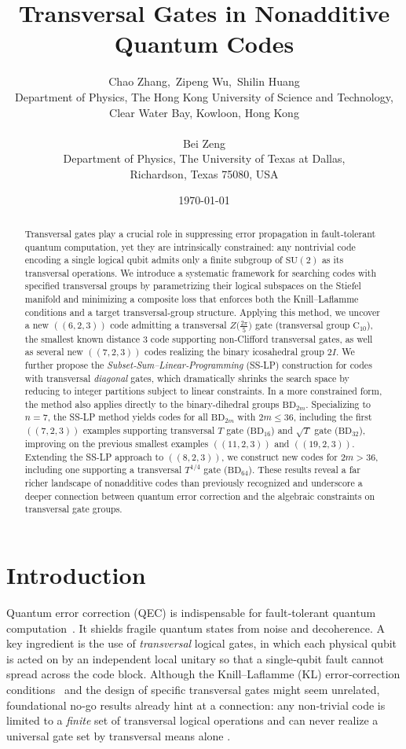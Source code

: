 \documentclass[8pt]{article}
\title{Transversal Gates in Nonadditive Quantum Codes}
\author{Chao Zhang,\   Zipeng Wu,\  Shilin Huang\\ 
Department of Physics, The Hong Kong University of Science and Technology, \\
Clear Water Bay, Kowloon, Hong Kong\\\small\\
Bei Zeng\\ Department of Physics, The University of Texas at Dallas,\\ Richardson, Texas 75080, USA}
\date{\today}
\theoremstyle{definition}
\begin{document}
\maketitle

\begin{abstract}
    Transversal gates play a crucial role in suppressing error propagation in fault‑tolerant quantum computation, yet they are intrinsically constrained: any nontrivial code encoding a single logical qubit admits only a finite subgroup of $\mathrm{SU}(2)$ as its transversal operations. We introduce a systematic framework for searching codes with specified transversal groups by parametrizing their logical subspaces on the Stiefel manifold and minimizing a composite loss that enforces both the Knill–Laflamme conditions and a target transversal‑group structure.  Applying this method, we uncover a new $((6,2,3))$ code admitting a transversal $Z\bigl(\tfrac{2\pi}{5}\bigr)$ gate (transversal group $\mathrm{C}_{10}$), the smallest known distance $3$ code supporting non‑Clifford transversal gates, as well as several new $((7,2,3))$ codes realizing the binary icosahedral group $2I$. We further propose the \emph{Subset‑Sum–Linear‑Programming} (SS‑LP) construction for codes with transversal \emph{diagonal} gates,  which dramatically shrinks the search space by reducing to integer partitions subject to linear constraints. In a more constrained form, the method also applies directly to the binary-dihedral groups $\mathrm{BD}_{2m}$.  Specializing to $n=7$, the SS‑LP method yields codes for all $\mathrm{BD}_{2m}$ with $2m\le 36$,  including the first $((7,2,3))$ examples supporting transversal $T$ gate ($\mathrm{BD}_{16}$) and $\sqrt{T}$ gate ($\mathrm{BD}_{32}$), improving on the previous smallest examples $((11,2,3))$ and $((19,2,3))$. Extending the SS-LP approach to $((8,2,3))$, we construct new codes for $2m>36$, including one supporting a transversal $T^{1/4}$ gate ($\mathrm{BD}_{64}$).  These results reveal a far richer landscape of nonadditive codes than previously recognized and underscore a deeper connection between quantum error correction and the algebraic constraints on transversal gate groups.
\end{abstract}

\section{Introduction}

Quantum error correction (QEC) is indispensable for fault‑tolerant quantum
computation~\cite{calderbank1998quantum}. It shields fragile quantum states from noise and decoherence.
A key ingredient is the use of \emph{transversal} logical gates, in which
each physical qubit is acted on by an independent local unitary so that a
single‑qubit fault cannot spread across the code block. Although the
Knill--Laflamme (KL) error‑correction conditions~\cite{knill1997theory} and the design of specific
transversal gates might seem unrelated, foundational no‑go results already
hint at a connection: any non‑trivial code is limited to a \emph{finite} set
of transversal logical operations and can never realize a universal gate set
by transversal means alone \cite{eastin2009restrictions,zeng2011transversality}.
\end{document}

